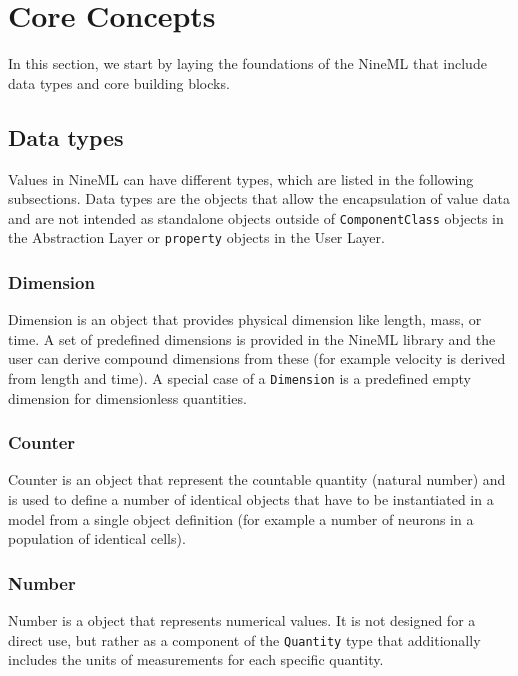 \documentclass{article}
\begin{document}
\section{Core Concepts}

In this section, we start by laying the foundations of the NineML
that include data types and core building blocks.

\subsection{Data types}
\label{DataTypes}

Values in NineML can have different types, which are listed in the
following subsections. Data types are the objects that allow the
encapsulation of value data and are not intended as standalone
objects outside of {\tt ComponentClass} objects in the Abstraction
Layer or {\tt property} objects in the User Layer.

\subsubsection{Dimension}

Dimension is an object that provides physical dimension like length,
mass, or time. A set of predefined dimensions is provided in the
NineML library and the user can derive compound dimensions from these
(for example velocity is derived from length and time). A special case
of a {\tt Dimension} is a predefined empty dimension for dimensionless
quantities.

\subsubsection{Counter}

Counter is an object that represent the countable quantity (natural
number) and is used to define a number of identical objects that have
to be instantiated in a model from a single object definition (for
example a number of neurons in a population of identical cells).

\subsubsection{Number}

Number is a object that represents numerical values. It is not designed for
a direct use, but rather as a component of the {\tt Quantity} type that
additionally includes the units of measurements for each specific quantity.
\end{document}
